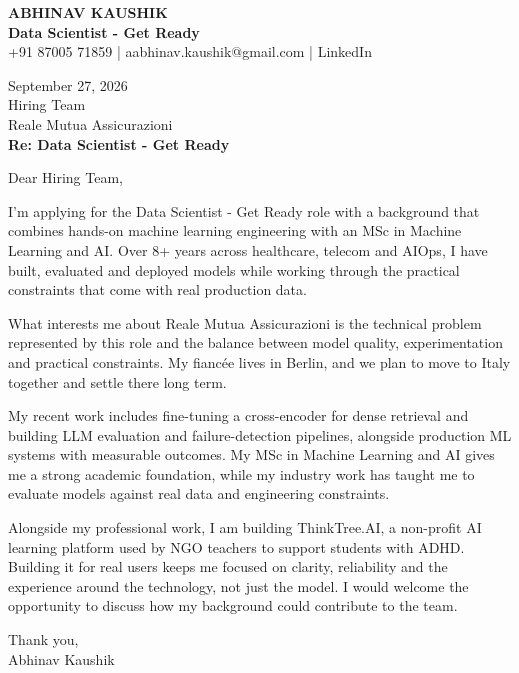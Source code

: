 \documentclass[10pt,a4paper]{article}
\begin{document}
\begin{center}
{\Large\bfseries ABHINAV KAUSHIK}\\[2pt]
{\bfseries Data Scientist - Get Ready}\\[2pt]
+91 87005 71859 \quad | \quad aabhinav.kaushik@gmail.com \quad | \quad LinkedIn
\end{center}
\vspace{8pt}
September 27, 2026\\[6pt]
Hiring Team\\
Reale Mutua Assicurazioni\\[4pt]
\textbf{Re: Data Scientist - Get Ready}

Dear Hiring Team,

I’m applying for the Data Scientist - Get Ready role with a background that combines hands-on machine learning engineering with an MSc in Machine Learning and AI. Over 8+ years across healthcare, telecom and AIOps, I have built, evaluated and deployed models while working through the practical constraints that come with real production data.

What interests me about Reale Mutua Assicurazioni is the technical problem represented by this role and the balance between model quality, experimentation and practical constraints. My fiancée lives in Berlin, and we plan to move to Italy together and settle there long term.

My recent work includes fine-tuning a cross-encoder for dense retrieval and building LLM evaluation and failure-detection pipelines, alongside production ML systems with measurable outcomes. My MSc in Machine Learning and AI gives me a strong academic foundation, while my industry work has taught me to evaluate models against real data and engineering constraints.

Alongside my professional work, I am building ThinkTree.AI, a non-profit AI learning platform used by NGO teachers to support students with ADHD. Building it for real users keeps me focused on clarity, reliability and the experience around the technology, not just the model. I would welcome the opportunity to discuss how my background could contribute to the team.

Thank you,\\
Abhinav Kaushik
\end{document}
